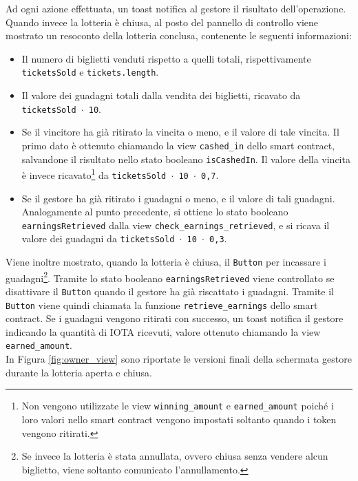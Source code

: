 \documentclass[12pt,a4paper,openright,twoside]{report}
\begin{document}
Ad ogni azione effettuata, un toast notifica al gestore il risultato dell'operazione.\\
Quando invece la lotteria è chiusa, al posto del pannello di controllo viene mostrato un resoconto della lotteria conclusa, contenente le seguenti informazioni:
\begin{itemize}
    \item Il numero di biglietti venduti rispetto a quelli totali, rispettivamente \texttt{ticketsSold} e \texttt{tickets.length}.
    \item Il valore dei guadagni totali dalla vendita dei biglietti, ricavato da \texttt{ticketsSold $\cdot$ 10}.
    \item Se il vincitore ha già ritirato la vincita o meno, e il valore di tale vincita. Il primo dato è ottenuto chiamando la view \texttt{cashed\_in} dello smart contract, salvandone il risultato nello stato booleano \texttt{isCashedIn}. Il valore della vincita è invece ricavato\footnote{\label{ftn:amount}Non vengono utilizzate le view \texttt{winning\_amount} e \texttt{earned\_amount} poiché i loro valori nello smart contract vengono impostati soltanto quando i token vengono ritirati.} da \texttt{ticketsSold $\cdot$ 10 $\cdot$ 0,7}.
    \item Se il gestore ha già ritirato i guadagni o meno, e il valore di tali guadagni. Analogamente al punto precedente, si ottiene lo stato booleano \texttt{earningsRetrieved} dalla view \texttt{check\_earnings\_retrieved}, e si ricava il valore dei guadagni da \texttt{ticketsSold $\cdot$ 10 $\cdot$ 0,3}.
\end{itemize}
Viene inoltre mostrato, quando la lotteria è chiusa, il \texttt{Button} per incassare i guadagni\footnote{Se invece la lotteria è stata annullata, ovvero chiusa senza vendere alcun biglietto, viene soltanto comunicato l'annullamento.}. Tramite lo stato booleano \texttt{earningsRetrieved} viene controllato se disattivare il \texttt{Button} quando il gestore ha già riscattato i guadagni. Tramite il \texttt{Button} viene quindi chiamata la funzione \texttt{retrieve\_earnings} dello smart contract. Se i guadagni vengono ritirati con successo, un toast notifica il gestore indicando la quantità di IOTA ricevuti, valore ottenuto chiamando la view \texttt{earned\_amount}.\\
In Figura \ref{fig:owner_view} sono riportate le versioni finali della schermata gestore durante la lotteria aperta e chiusa.
\end{document}
